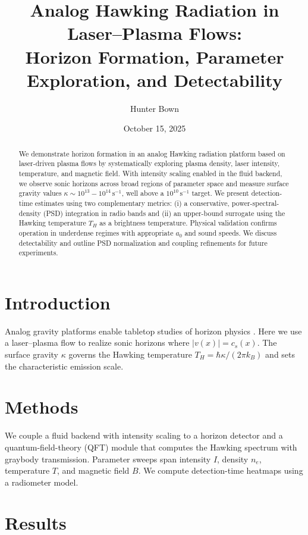 \documentclass[11pt]{article}
\title{Analog Hawking Radiation in Laser--Plasma Flows:\\Horizon Formation, Parameter Exploration, and Detectability}
\author{Hunter Bown}
\date{October 15, 2025}
\begin{document}
\maketitle

\begin{abstract}
We demonstrate horizon formation in an analog Hawking radiation platform based on laser-driven plasma flows by systematically exploring plasma density, laser intensity, temperature, and magnetic field. With intensity scaling enabled in the fluid backend, we observe sonic horizons across broad regions of parameter space and measure surface gravity values $\kappa \sim 10^{13}{-}10^{14}\,\mathrm{s^{-1}}$, well above a $10^{10}\,\mathrm{s^{-1}}$ target. We present detection-time estimates using two complementary metrics: (i) a conservative, power-spectral-density (PSD) integration in radio bands and (ii) an upper-bound surrogate using the Hawking temperature $T_H$ as a brightness temperature. Physical validation confirms operation in underdense regimes with appropriate $a_0$ and sound speeds. We discuss detectability and outline PSD normalization and coupling refinements for future experiments.
\end{abstract}

\section{Introduction}
Analog gravity platforms enable tabletop studies of horizon physics \cite{Hawking1974,Hawking1975,Unruh1981,Barcelo2011}. Here we use a laser--plasma flow to realize sonic horizons where $|v(x)| = c_s(x)$. The surface gravity $\kappa$ governs the Hawking temperature $T_H = \hbar \kappa/(2\pi k_B)$ and sets the characteristic emission scale.

\section{Methods}
We couple a fluid backend with intensity scaling to a horizon detector and a quantum-field-theory (QFT) module that computes the Hawking spectrum with graybody transmission. Parameter sweeps span intensity $I$, density $n_e$, temperature $T$, and magnetic field $B$. We compute detection-time heatmaps using a radiometer model.

\section{Results}
\end{document}
